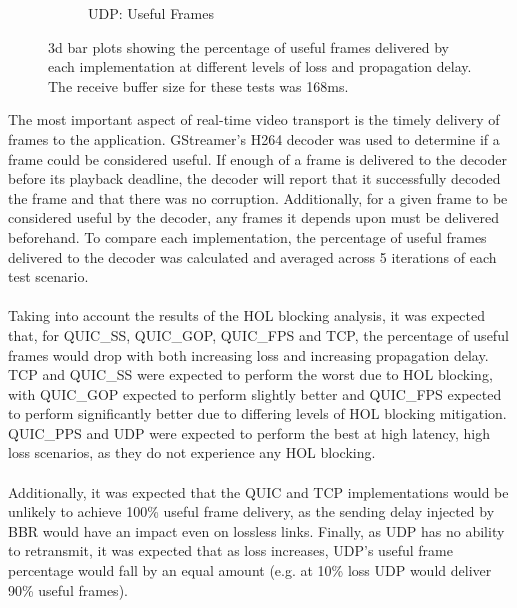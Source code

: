 \documentclass{mpaper}
\begin{document}
\begin{figure}
\begin{subfigure}[b]{0.25\textwidth}
      \caption{UDP: Useful Frames}
      \label{fig:UDP_bar-168}
  \end{subfigure}
     \vspace{0.1cm}
     \centering
     \caption{3d bar plots showing the percentage of useful frames delivered by each implementation at different levels of loss and propagation delay. The receive buffer size for these tests was 168ms.}
     \label{fig: 168-bar}
\end{figure}


\noindent The most important aspect of real-time video transport is the timely delivery of frames to the application. GStreamer's H264 decoder was used to determine if a frame could be considered useful. If enough of a frame is delivered to the decoder before its playback deadline, the decoder will report that it successfully decoded the frame and that there was no corruption. Additionally, for a given frame to be considered useful by the decoder, any frames it depends upon must be delivered beforehand. To compare each implementation, the percentage of useful frames delivered to the decoder was calculated and averaged across 5 iterations of each test scenario.
\\\\
Taking into account the results of the HOL blocking analysis, it was expected that, for QUIC\_SS, QUIC\_GOP, \newline QUIC\_FPS and TCP, the percentage of useful frames would drop with both increasing loss and increasing propagation delay. TCP and QUIC\_SS were expected to perform the worst due to HOL blocking, with QUIC\_GOP expected to perform slightly better and QUIC\_FPS expected to perform significantly better due to differing levels of HOL blocking mitigation. \newline QUIC\_PPS and UDP were expected to perform the best at high latency, high loss scenarios, as they do not experience any HOL blocking. 
\\\\
Additionally, it was expected that the QUIC and TCP implementations would be unlikely to achieve 100\% useful frame delivery, as the sending delay injected by BBR would have an impact even on lossless links. Finally, as UDP has no ability to retransmit, it was expected that as loss increases, UDP's useful frame percentage would fall by an equal amount (e.g. at 10\% loss UDP would deliver 90\% useful frames).
\\\\
\end{document}
